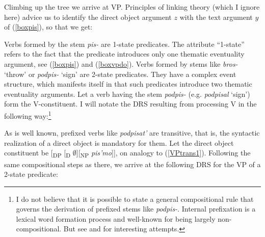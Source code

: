 \documentclass[output=paper,colorlinks,citecolor=brown]{langscibook}
\begin{document}

\noindent Climbing up the tree we arrive at VP. Principles of linking theory (which I ignore here) advice us to identify the direct object argument $z$ with the text argument $y$ of (\ref{boxpis}), so that we get: 


\noindent Verbs formed by the stem \textit{pis-} are 1-state predicates. 
The attribute ``1-state'' refers to the fact that the predicate introduces only one thematic eventuality argument, see (\ref{boxpis}) and (\ref{boxvpdo}).  
Verbs formed by stems like \textit{bros-} `throw' or \textit{podpis-} `sign' are 2-state predicates. They have a complex event structure, which manifests itself in that such predicates introduce two thematic eventuality arguments. Let a verb having the stem \textit{podpis-} 
(e.g. \textit{podpisal} `sign') form the V-constituent. I will notate the DRS resulting from processing V in the following way:\footnote{I do not believe that it is possible to state a general compositional rule that governs the derivation of prefixed stems like \textit{podpis-}. Internal prefixation is a lexical word formation process and well-known for being largely non-compositional. But see \citet{Kagan15} and \citet{Biskup2019} for interesting attempts.}


\noindent As is well known, prefixed verbs like \textit{podpisat'} are transitive, that is, the syntactic realization of a direct object is mandatory for them. Let the direct object constituent be [\textsubscript{DP} [\textsubscript{D} $\emptyset$][\textsubscript{NP} \textit{pis'mo}]], on analogy to (\ref{VPtrans1}). Following the same compositional steps as there,
we arrive at the following DRS for the VP of a 2-state predicate:  

\end{document}
